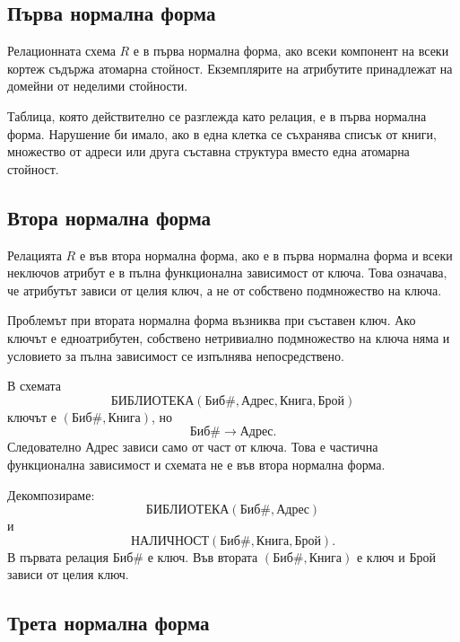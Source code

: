 \subsection{Първа нормална форма}\label{s:24.1.6}

\begin{defn}
Релационната схема $R$ е в първа нормална форма, ако всеки компонент на всеки кортеж съдържа атомарна стойност. Екземплярите на атрибутите принадлежат на домейни от неделими стойности.
\end{defn}

Таблица, която действително се разглежда като релация, е в първа нормална форма. Нарушение би имало, ако в една клетка се съхранява списък от книги, множество от адреси или друга съставна структура вместо една атомарна стойност.

\subsection{Втора нормална форма}\label{s:24.1.7}

\begin{defn}
Релацията $R$ е във втора нормална форма, ако е в първа нормална форма и всеки неключов атрибут е в пълна функционална зависимост от ключа. Това означава, че атрибутът зависи от целия ключ, а не от собствено подмножество на ключа.
\end{defn}

Проблемът при втората нормална форма възниква при съставен ключ. Ако ключът е едноатрибутен, собствено нетривиално подмножество на ключа няма и условието за пълна зависимост се изпълнява непосредствено.

В схемата
\[
\mathrm{БИБЛИОТЕКА}(\mathrm{Биб\#},\mathrm{Адрес},\mathrm{Книга},\mathrm{Брой})
\]
ключът е $(\mathrm{Биб\#},\mathrm{Книга})$, но
\[
\mathrm{Биб\#}\to\mathrm{Адрес}.
\]
Следователно $\mathrm{Адрес}$ зависи само от част от ключа. Това е частична функционална зависимост и схемата не е във втора нормална форма.

Декомпозираме:
\[
\mathrm{БИБЛИОТЕКА}(\mathrm{Биб\#},\mathrm{Адрес})
\]
и
\[
\mathrm{НАЛИЧНОСТ}(\mathrm{Биб\#},\mathrm{Книга},\mathrm{Брой}).
\]
В първата релация $\mathrm{Биб\#}$ е ключ. Във втората $(\mathrm{Биб\#},\mathrm{Книга})$ е ключ и $\mathrm{Брой}$ зависи от целия ключ.

\subsection{Трета нормална форма}\label{s:24.1.8}

